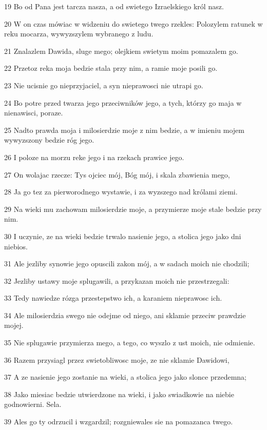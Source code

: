\par 19 Bo od Pana jest tarcza nasza, a od swietego Izraelskiego król nasz.
\par 20 W on czas mówiac w widzeniu do swietego twego rzekles: Polozylem ratunek w reku mocarza, wywyzszylem wybranego z ludu.
\par 21 Znalazlem Dawida, sluge mego; olejkiem swietym moim pomazalem go.
\par 22 Przetoz reka moja bedzie stala przy nim, a ramie moje posili go.
\par 23 Nie ucisnie go nieprzyjaciel, a syn nieprawosci nie utrapi go.
\par 24 Bo potre przed twarza jego przeciwników jego, a tych, którzy go maja w nienawisci, poraze.
\par 25 Nadto prawda moja i milosierdzie moje z nim bedzie, a w imieniu mojem wywyzszony bedzie róg jego.
\par 26 I poloze na morzu reke jego i na rzekach prawice jego.
\par 27 On wolajac rzecze: Tys ojciec mój, Bóg mój, i skala zbawienia mego,
\par 28 Ja go tez za pierworodnego wystawie, i za wyzszego nad królami ziemi.
\par 29 Na wieki mu zachowam milosierdzie moje, a przymierze moje stale bedzie przy nim.
\par 30 I uczynie, ze na wieki bedzie trwalo nasienie jego, a stolica jego jako dni niebios.
\par 31 Ale jezliby synowie jego opuscili zakon mój, a w sadach moich nie chodzili;
\par 32 Jezliby ustawy moje splugawili, a przykazan moich nie przestrzegali:
\par 33 Tedy nawiedze rózga przestepstwo ich, a karaniem nieprawosc ich.
\par 34 Ale milosierdzia swego nie odejme od niego, ani sklamie przeciw prawdzie mojej.
\par 35 Nie splugawie przymierza mego, a tego, co wyszlo z ust moich, nie odmienie.
\par 36 Razem przysiagl przez swietobliwosc moje, ze nie sklamie Dawidowi,
\par 37 A ze nasienie jego zostanie na wieki, a stolica jego jako slonce przedemna;
\par 38 Jako miesiac bedzie utwierdzone na wieki, i jako swiadkowie na niebie godnowierni. Sela.
\par 39 Ales go ty odrzucil i wzgardzil; rozgniewales sie na pomazanca twego.
